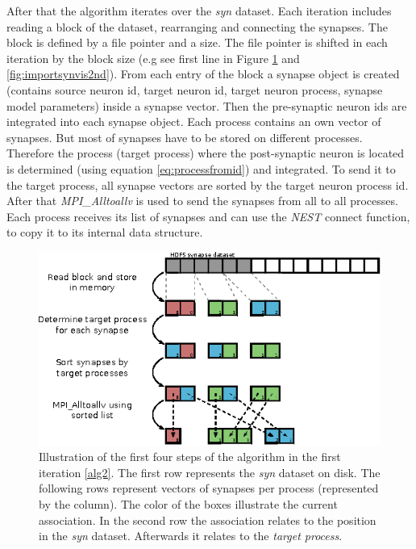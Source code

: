 After that the algorithm iterates over the \emph{syn} dataset.
Each iteration includes reading a block of the dataset, rearranging and connecting the synapses.
The block is defined by a file pointer and a size.
The file pointer is shifted in each iteration by the block size
(e.g see first line in Figure \ref{fig:importsynvis} and \ref{fig:importsynvis2nd}).
From each entry of the block a synapse object is created
(contains source neuron id, target neuron id, target neuron process, synapse model parameters)
inside a synapse vector. Then the pre-synaptic neuron ids are integrated into each synapse object.
Each process contains an own vector of synapses.
But most of synapses have to be stored on different processes.
Therefore the process (target process) where the post-synaptic neuron is located is determined (using equation \ref{eq:processfromid})
and integrated.
To send it to the target process, all synapse vectors are sorted by the target neuron process id.
After that \emph{MPI\_Alltoallv} is used to send the synapses from all to all processes.
Each process receives its list of synapses and can use the \emph{NEST} connect function, to copy it to its internal data structure.
\begin{figure}[ht!]
\centering
\includegraphics[scale=2.0]{pictures/import_syn_vis.eps}
\caption{Illustration of the first four steps of the algorithm in the first iteration \ref{alg2}.
The first row represents the \emph{syn} dataset on disk.
The following rows represent vectors of synapses per process (represented by the column).
The color of the boxes illustrate the current association.
In the second row the association relates to the position in the \emph{syn} dataset.
Afterwards it relates to the \emph{target process}.
}
\label{fig:importsynvis}
\end{figure}

